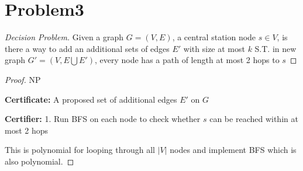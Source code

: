 \documentclass[openany]{article}
\begin{document}
\section*{Problem3}

\begin{proof}[Decision Problem]
    \renewcommand{\qedsymbol}{}
        Given a graph $G=(V,E)$, a central station node $s\in V$, is there a way to add an additional sets of edges $E'$ with size at most $k$ S.T. in new graph $G'=(V, E\bigcup E')$, every node has a path of length at most 2 hops to $s$    
\end{proof}
\begin{proof}{NP}

    \textbf{Certificate:} A proposed set of additional edges $E'$ on $G$

    \textbf{Certifier:} 1. Run BFS on each node to check whether $s$ can be reached within at most 2 hops

    This is polynomial for looping through all $|V|$ nodes and implement BFS which is also polynomial.

   
\end{proof}
\end{document}
